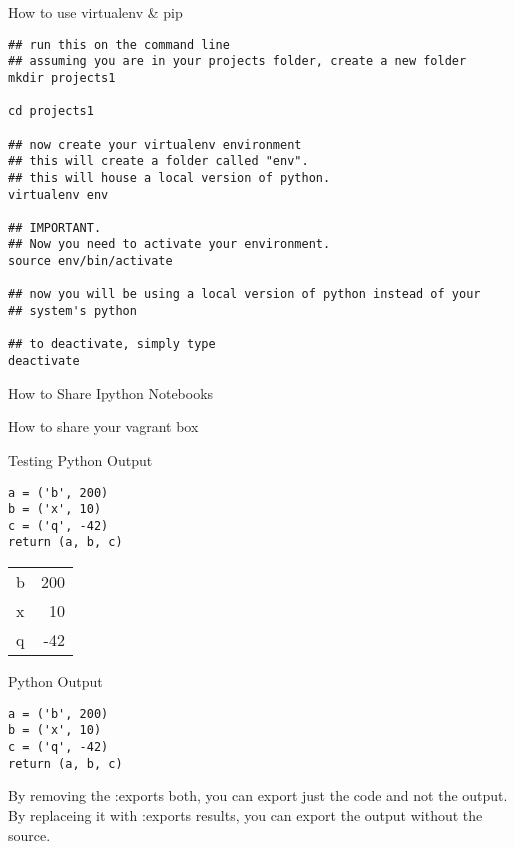 \documentclass[presentation]{beamer}
\begin{document}
\begin{frame}[fragile,label=sec-7-1]{How to use virtualenv \& pip}
 \lstset{numbers=left,language=sh}
\begin{lstlisting}
## run this on the command line
## assuming you are in your projects folder, create a new folder
mkdir projects1 

cd projects1

## now create your virtualenv environment
## this will create a folder called "env". 
## this will house a local version of python. 
virtualenv env 

## IMPORTANT. 
## Now you need to activate your environment. 
source env/bin/activate

## now you will be using a local version of python instead of your
## system's python

## to deactivate, simply type
deactivate
\end{lstlisting}
\end{frame}
\begin{frame}[label=sec-7-2]{How to Share Ipython Notebooks}
\end{frame}

\begin{frame}[label=sec-7-3]{How to share your vagrant box}
\end{frame}
\begin{frame}[fragile,label=sec-7-4]{Testing Python Output}
 \lstset{numbers=left,language=Python}
\begin{lstlisting}
a = ('b', 200)
b = ('x', 10)
c = ('q', -42)
return (a, b, c)
\end{lstlisting}

\begin{center}
\begin{tabular}{lr}
b & 200\\
x & 10\\
q & -42\\
\end{tabular}
\end{center}
\end{frame}

\begin{frame}[fragile,label=sec-7-5]{Python Output}
 \lstset{numbers=left,language=Python}
\begin{lstlisting}
a = ('b', 200)
b = ('x', 10)
c = ('q', -42)
return (a, b, c)
\end{lstlisting}

By removing the :exports both, you can export just the code and not the output. By replaceing it with :exports results, you can export the output without the source. 
\end{frame}
\end{document}
